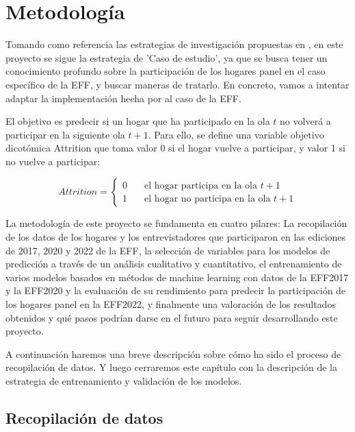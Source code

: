 \section{Metodología}

Tomando como referencia las estrategias de investigación propuestas en \cite{oates2022researching}, en este proyecto se sigue la estrategia de 'Caso de estudio', ya que se busca tener un conocimiento profundo sobre la participación de los hogares panel en el caso específico de la EFF, y buscar maneras de tratarlo. En concreto, vamos a intentar adaptar la implementación hecha por \cite{beste2023case} al caso de la EFF.

El objetivo es predecir si un hogar que ha participado en la ola $t$ no volverá a participar en la siguiente ola $t+1$. Para ello, se define una variable objetivo dicotómica Attrition que toma valor 0 si el hogar vuelve a participar, y valor 1 si no vuelve a participar:

\begin{equation}
Attrition =
  \begin{cases}
    0       & \quad \text{el hogar participa en la ola $t+1$} \\
    1  & \quad \text{el hogar no participa en la ola $t+1$}
  \end{cases}
\end{equation}

La metodología de este proyecto se fundamenta en cuatro pilares: La recopilación de los datos de los hogares y los entrevistadores que participaron en las ediciones de 2017, 2020 y 2022 de la EFF, la selección de variables para los modelos de predicción a través de un análisis cualitativo y cuantitativo, el entrenamiento de varios modelos basados en métodos de machine learning con datos de la EFF2017 y la EFF2020 y la evaluación de su rendimiento para predecir la participación de los hogares panel en la EFF2022, y finalmente una valoración de los resultados obtenidos y qué pasos podrían darse en el futuro para seguir desarrollando este proyecto.

A continuación haremos una breve descripción sobre cómo ha sido el proceso de recopilación de datos. Y luego cerraremos este capítulo con la descripción de la estrategia de entrenamiento y validación de los modelos.

\subsection{Recopilación de datos}

